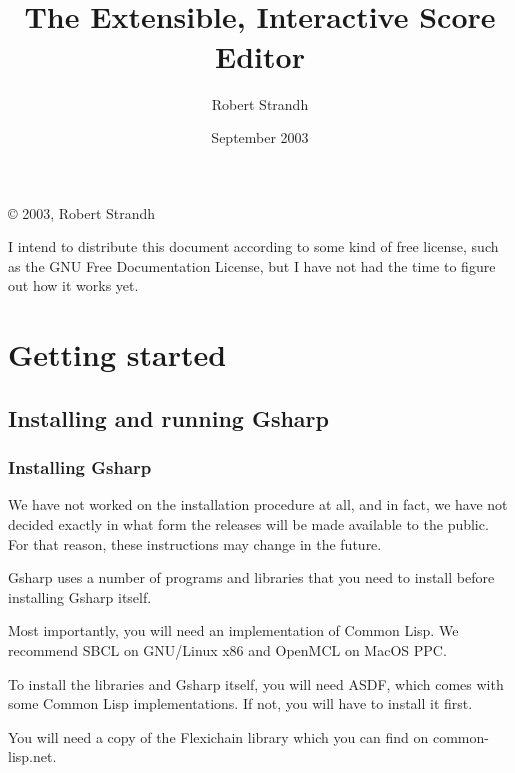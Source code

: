 \documentclass[11pt]{book}
\title{{\Huge {\gs}}\\{\huge The Extensible, Interactive Score Editor}}
\author{{\Large Robert Strandh}}
\date{September 2003}
\def\commonlisp{Common Lisp}
\def\gs{Gsharp}
\def\inputtex#1{}
\begin{document}

\maketitle

\newpage

\vspace*{\fill}
\copyright{} 2003, Robert Strandh

I intend to distribute this document according to some kind of free
license, such as the GNU Free Documentation License, but I have not
had the time to figure out how it works yet. 

\newpage

{\setlength{\parskip}{0cm}
\tableofcontents}

\inputtex{intro.tex}

\part{Getting started}

\chapter{Installing and running {\gs}}

\section{Installing {\gs}}

We have not worked on the installation procedure at all, and in fact,
we have not decided exactly in what form the releases will be made
available to the public.  For that reason, these instructions may
change in the future. 

{\gs} uses a number of programs and libraries that you need to install
before installing {\gs} itself.


Most importantly, you will need an implementation of {\commonlisp}.
We recommend SBCL on GNU/Linux x86 and OpenMCL on MacOS PPC.

To install the libraries and {\gs} itself, you will need ASDF, which
comes with some {\commonlisp} implementations.  If not, you will have
to install it first. 

You will need a copy of the Flexichain library which you can find on
common-lisp.net.  
\end{document}
